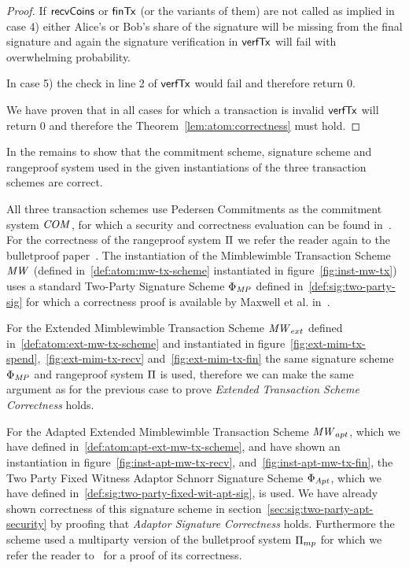 \begin{proof}
    If $\mathsf{recvCoins}$ or $\mathsf{finTx}$ (or the variants of them) are not called as implied in case 4) either Alice's or Bob's share of the signature will be missing from the final signature and again the signature verification in $\mathsf{verfTx}$ will fail with overwhelming probability.

    In case 5) the check in line 2 of $\mathsf{verfTx}$ would fail and therefore return 0.

    We have proven that in all cases for which a transaction is invalid $\mathsf{verfTx}$ will return 0 and therefore the Theorem~\ref{lem:atom:correctness} must hold.
\end{proof}

In the remains to show that the commitment scheme, signature scheme and rangeproof system used in the given instantiations of the three transaction schemes are correct.

All three transaction schemes use Pedersen Commitments as the commitment system $\mathit{COM}$, for which a security and correctness evaluation can be found in~\cite{pedersen1991non}.
For the correctness of the rangeproof system $\Pi$ we refer the reader again to the bulletproof paper~\cite{bunz2018bulletproofs}.
The instantiation of the Mimblewimble Transaction Scheme $\mathit{MW}$ (defined in~\ref{def:atom:mw-tx-scheme} instantiated in figure~\ref{fig:inst-mw-tx}) uses a standard Two-Party Signature Scheme $\Phi_{\mathit{MP}}$ defined in~\ref{def:sig:two-party-sig} for which a correctness proof is available by Maxwell et al. in~\cite{maxwell2019simple}.

For the Extended Mimblewimble Transaction Scheme $\mathit{MW}_{ext}$ defined in~\ref{def:atom:ext-mw-tx-scheme} and instantiated in figure~\ref{fig:ext-mim-tx-spend},~\ref{fig:ext-mim-tx-recv} and~\ref{fig:ext-mim-tx-fin} the same signature scheme $\Phi_{\mathit{MP}}$ and rangeproof system $\Pi$ is used, therefore we can make the same argument as for the previous case to prove \emph{Extended Transaction Scheme Correctness} holds.

For the Adapted Extended Mimblewimble Transaction Scheme $\mathit{MW}_{apt}$, which we have defined in~\ref{def:atom:apt-ext-mw-tx-scheme}, and have shown an instantiation in figure~\ref{fig:inst-apt-mw-tx-recv}, and~\ref{fig:inst-apt-mw-tx-fin}, the Two Party Fixed Witness Adaptor Schnorr Signature Scheme $\Phi_{\mathit{Apt}}$, which we have defined in~\ref{def:sig:two-party-fixed-wit-apt-sig}, is used.
We have already shown correctness of this signature scheme in section~\ref{sec:sig:two-party-apt-security} by proofing that \emph{Adaptor Signature Correctness} holds.
Furthermore the scheme used a multiparty version of the bulletproof system $\Pi_{mp}$ for which we refer the reader to~\cite{klinec2020privacy} for a proof of its correctness.

